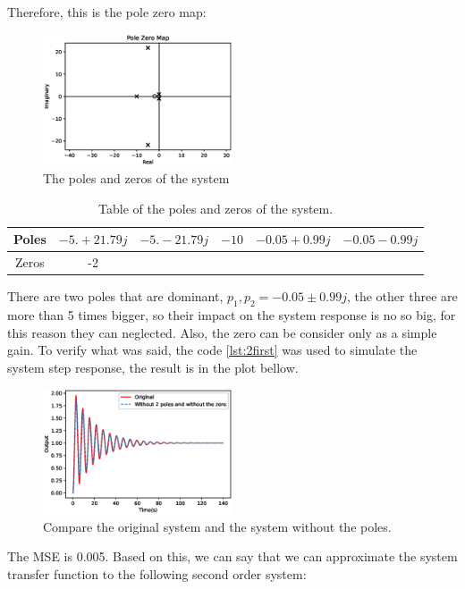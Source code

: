 \documentclass[a4paper]{article}
\begin{document}
Therefore, this is the pole zero map:
\begin{figure}[H]
    \centering
    \includegraphics[width=0.5\textwidth]{Figures/Question2/EXE_2_POLE_ZERO_MAP.eps}
    \caption{The poles and zeros of the system}
    \label{fig:exercise2}
\end{figure}
\begin{table}[H]
\centering
\begin{tabular}{|c|c|c|c|c|c|}
\hline
Poles & $-5. +21.79j$&$-5. -21.79j$& $-10$&$-0.05 +0.99j$& $-0.05 -0.99j$\\
\hline
Zeros & -2 & & & &\\
\hline
\end{tabular}
\caption{Table of the poles and zeros of the system.}
\end{table}
There are two poles that are dominant, $p_1,p_2=-0.05 \pm 0.99j$, the other three are more than 5 times bigger, so their impact on the system response is no so big, for this reason they can neglected. Also, the zero can be consider only as a simple gain. To verify what was said, the code \ref{lst:2first} was used to simulate the system step response, the result is in the plot bellow.
\begin{figure}[H]
    \centering
    \includegraphics[width=0.5\textwidth]{Figures/Question2/EXE_2_ITEM_2.eps}
    \caption{Compare the original system and the system without the poles.}
    \label{fig:exercise2_item_2}
\end{figure}
The MSE is 0.005. Based on this, we can say that we can approximate the system transfer function to the following second order system:
\end{document}
